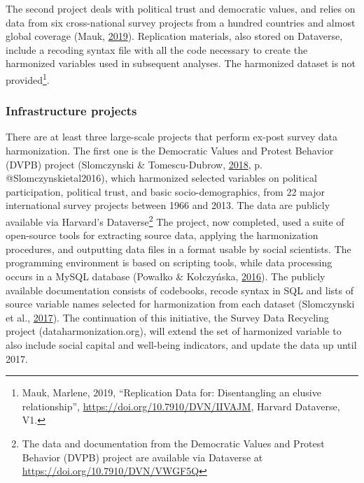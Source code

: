 \documentclass[12pt,]{article}
\let\rmarkdownfootnote\footnote%
\def\footnote{\protect\rmarkdownfootnote}
\begin{document}
The second project deals with political trust and democratic values, and relies on data from six cross-national survey projects from a hundred countries and almost global coverage (Mauk, \protect\hyperlink{ref-Mauk2019}{2019}). Replication materials, also stored on Dataverse, include a recoding syntax file with all the code necessary to create the harmonized variables used in subsequent analyses. The harmonized dataset is not provided\footnote{Mauk, Marlene, 2019, ``Replication Data for: Disentangling an elusive relationship'', \url{https://doi.org/10.7910/DVN/IIVAJM}, Harvard Dataverse, V1.}.

\hypertarget{infrastructure-projects}{%
\subsubsection{Infrastructure projects}\label{infrastructure-projects}}

There are at least three large-scale projects that perform ex-post survey data harmonization. The first one is the Democratic Values and Protest Behavior (DVPB) project (Slomczynski \& Tomescu-Dubrow, \protect\hyperlink{ref-Slomczynski2018}{2018}, p. @Slomczynskietal2016), which harmonized selected variables on political participation, political trust, and basic socio-demographics, from 22 major international survey projects between 1966 and 2013. The data are publicly available via Harvard's Dataverse\footnote{The data and documentation from the Democratic Values and Protest Behavior (DVPB) project are available via Dataverse at \url{https://doi.org/10.7910/DVN/VWGF5Q}}
The project, now completed, used a suite of open-source tools for extracting source data, applying the harmonization procedures, and outputting data files in a format usable by social scientists. The programming environment is based on scripting tools, while data processing occurs in a MySQL database (Powałko \& Kołczyńska, \protect\hyperlink{ref-Powako2016}{2016}). The publicly available documentation consists of codebooks, recode syntax in SQL and lists of source variable names selected for harmonization from each dataset (Slomczynski et al., \protect\hyperlink{ref-Slomczynskietal2017}{2017}).
The continuation of this initiative, the Survey Data Recycling project (dataharmonization.org), will extend the set of harmonized variable to also include social capital and well-being indicators, and update the data up until 2017.
\end{document}

